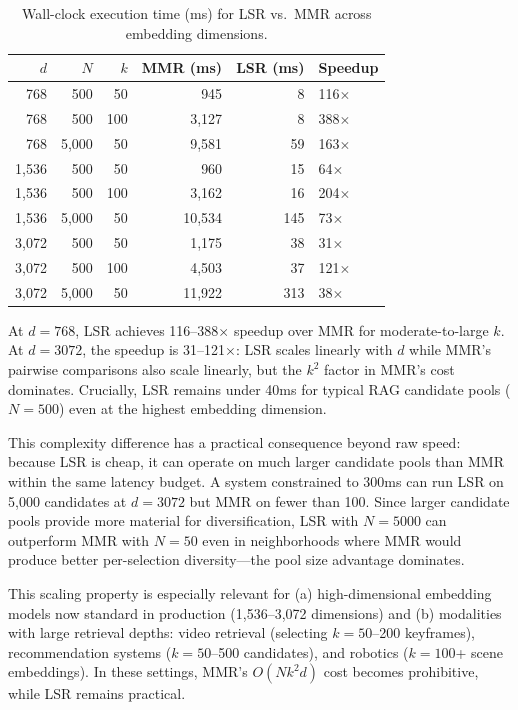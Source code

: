 \documentclass{article}
\begin{document}
\begin{table}[h]
\centering
\caption{Wall-clock execution time (ms) for LSR vs.\ MMR across embedding dimensions.}
\label{tab:timing}
\begin{tabular}{@{}rrrrrl@{}}
\toprule
$d$ & $N$ & $k$ & MMR (ms) & LSR (ms) & Speedup \\
\midrule
768 & 500 & 50 & 945 & 8 & 116$\times$ \\
768 & 500 & 100 & 3,127 & 8 & 388$\times$ \\
768 & 5,000 & 50 & 9,581 & 59 & 163$\times$ \\
\midrule
1,536 & 500 & 50 & 960 & 15 & 64$\times$ \\
1,536 & 500 & 100 & 3,162 & 16 & 204$\times$ \\
1,536 & 5,000 & 50 & 10,534 & 145 & 73$\times$ \\
\midrule
3,072 & 500 & 50 & 1,175 & 38 & 31$\times$ \\
3,072 & 500 & 100 & 4,503 & 37 & 121$\times$ \\
3,072 & 5,000 & 50 & 11,922 & 313 & 38$\times$ \\
\bottomrule
\end{tabular}
\end{table}

At $d = 768$, LSR achieves 116--388$\times$ speedup over MMR for moderate-to-large $k$. At $d = 3072$, the speedup is 31--121$\times$: LSR scales linearly with $d$ while MMR's pairwise comparisons also scale linearly, but the $k^2$ factor in MMR's cost dominates. Crucially, LSR remains under 40ms for typical RAG candidate pools ($N\!=\!500$) even at the highest embedding dimension.

This complexity difference has a practical consequence beyond raw speed: because LSR is cheap, it can operate on much larger candidate pools than MMR within the same latency budget. A system constrained to 300ms can run LSR on 5,000 candidates at $d\!=\!3072$ but MMR on fewer than 100. Since larger candidate pools provide more material for diversification, LSR with $N\!=\!5000$ can outperform MMR with $N\!=\!50$ even in neighborhoods where MMR would produce better per-selection diversity---the pool size advantage dominates.

This scaling property is especially relevant for (a) high-dimensional embedding models now standard in production (1,536--3,072 dimensions) and (b) modalities with large retrieval depths: video retrieval (selecting $k\!=\!50$--200 keyframes), recommendation systems ($k\!=\!50$--500 candidates), and robotics ($k\!=\!100$+ scene embeddings). In these settings, MMR's $O(Nk^2d)$ cost becomes prohibitive, while LSR remains practical.
\end{document}
